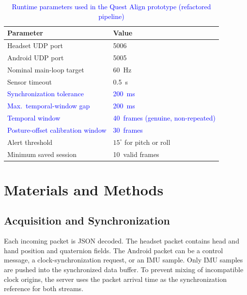 \documentclass[conference]{IEEEtran}
\newcommand{\CC}[1]{\textcolor{blue}{#1}}
\begin{document}
\begin{table}[t]
\caption{\CC{Runtime parameters used in the Quest Align prototype (refactored pipeline)}}
\label{tab:runtime_params}
\centering
\renewcommand{\arraystretch}{1.15}
\begin{tabular}{ll}
\toprule
Parameter & Value \\
\midrule
Headset UDP port          & 5006 \\
Android UDP port          & 5005 \\
Nominal main-loop target  & 60~Hz \\
Sensor timeout            & 0.5~s \\
\CC{Synchronization tolerance} & \CC{200~ms} \\
\CC{Max.\ temporal-window gap} & \CC{200~ms} \\
\CC{Temporal window} & \CC{40~frames (genuine, non-repeated)} \\
\CC{Posture-offset calibration window} & \CC{30~frames} \\
Alert threshold           & $15^{\circ}$ for pitch or roll \\
Minimum saved session     & 10~valid frames \\
\bottomrule
\end{tabular}
\end{table}

\section{Materials and Methods}
\subsection{Acquisition and Synchronization}
Each incoming packet is JSON decoded. The headset packet contains head and hand position
and quaternion fields. The Android packet can be a control message, a clock-synchronization
request, or an IMU sample. Only IMU samples are pushed into the synchronized data buffer.
To prevent mixing of incompatible clock origins, the server uses the packet arrival time as
the synchronization reference for both streams.
\end{document}
